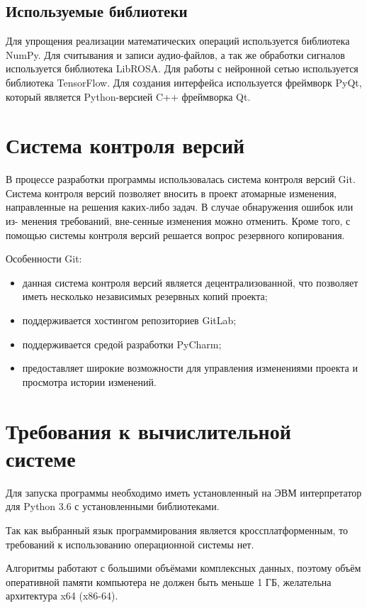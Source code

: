 \subsection{Используемые библиотеки}

Для упрощения реализации математических операций используется библиотека NumPy. Для считывания и записи аудио-файлов, а так же обработки сигналов используется библиотека LibROSA. Для работы с нейронной сетью используется библиотека TensorFlow. Для создания интерфейса используется фреймворк PyQt, который является Python-версией C++ фреймворка Qt.

\section{Система контроля версий}

В процессе разработки программы использовалась система контроля версий
Git. Система контроля версий позволяет вносить в проект атомарные изменения, направленные на решения каких-либо задач. В случае обнаружения ошибок или из- менения требований, вне-сенные изменения можно отменить. Кроме того, с помощью системы контроля версий решается вопрос резервного копирования.

Особенности Git:

\begin{itemize}
	\item данная система контроля версий является децентрализованной, что позволяет иметь несколько независимых резервных копий проекта;
	\item поддерживается хостингом репозиториев GitLab;
	\item поддерживается средой разработки PyCharm;
	\item предоставляет широкие возможности для управления изменениями проекта и просмотра истории изменений.
\end{itemize}

\section{Требования к вычислительной системе}

Для запуска программы необходимо иметь установленный на ЭВМ интерпретатор для Python 3.6 с установленными библиотеками. 

Так как выбранный язык программирования является кроссплатформенным, то требований к использованию операционной системы нет.

Алгоритмы работают с большими объёмами комплексных данных, поэтому объём оперативной памяти компьютера не должен быть меньше 1 ГБ, желательна архитектура x64 (x86-64).

